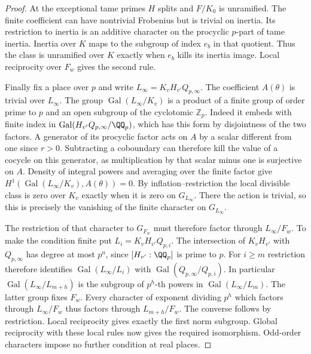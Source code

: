 \documentclass[a4paper,11pt]{article}
\theoremstyle{definition}
\theoremstyle{remark}
\newcommand{\ZZ}{\mathbb Z}\newcommand{\ord}{\operatorname{ord}}
\numberwithin{equation}{section}
\begin{document}
\begin{proof}
At the exceptional tame primes \(H\) splits and \(F/K_0\) is
unramified. The finite coefficient can have nontrivial
Frobenius but is trivial on inertia. Its restriction to inertia
is an additive character on the procyclic \(p\)-part of tame
inertia. Inertia over \(K\) maps to the subgroup of index \(e_b\)
in that quotient. Thus the class is unramified over \(K\) exactly
when \(e_b\) kills its inertia image. Local reciprocity over \(F_w\)
gives the second rule.

Finally fix a place over \(p\) and write
\(L_\infty=K_v H_{v'}Q_{p,\infty}\). The coefficient \(A(\theta)\)
is trivial over \(L_\infty\). The group
\(\operatorname{Gal}(L_\infty/K_v)\) is a product of a finite
group of order prime to \(p\) and an open subgroup of the
cyclotomic \(\ZZ_p\). Indeed it embeds with finite index in
\(\operatorname{Gal}(H_{v'}Q_{p,\infty}/\QQ_p)\), which has
this form by disjointness of the two factors. A generator of
its procyclic factor acts on \(A\) by a scalar different from
one since \(r>0\). Subtracting a coboundary can therefore kill
the value of a cocycle on this generator, as multiplication
by that scalar minus one is surjective on \(A\). Density of
integral powers and averaging over the finite factor give
\(H^1(\operatorname{Gal}(L_\infty/K_v),A(\theta))=0\).
By inflation--restriction the local divisible class is zero
over \(K_v\) exactly when it is zero on \(G_{L_\infty}\).
There the action is trivial, so this is precisely the vanishing
of the finite character on \(G_{L_\infty}\).

The restriction of that character to \(G_{F_w}\) must therefore
factor through \(L_\infty/F_w\). To make the condition finite put
\(L_i=K_v H_{v'}Q_{p,i}\). The intersection of \(K_v H_{v'}\)
with \(Q_{p,\infty}\) has degree at most \(p^a\), since
\([H_{v'}:\QQ_p]\) is prime to \(p\). For \(i\ge m\) restriction
therefore identifies \(\operatorname{Gal}(L_\infty/L_i)\) with
\(\operatorname{Gal}(Q_{p,\infty}/Q_{p,i})\). In particular
\(\operatorname{Gal}(L_\infty/L_{m+h})\) is the subgroup
of \(p^h\)-th powers in \(\operatorname{Gal}(L_\infty/L_m)\).
The latter group fixes \(F_w\). Every character of exponent
dividing \(p^h\) which factors through \(L_\infty/F_w\) thus
factors through \(L_{m+h}/F_w\). The converse follows by
restriction. Local reciprocity gives exactly the first norm
subgroup. Global reciprocity with these local rules now gives
the required isomorphism. Odd-order characters impose no
further condition at real places.
\end{proof}
\end{document}
